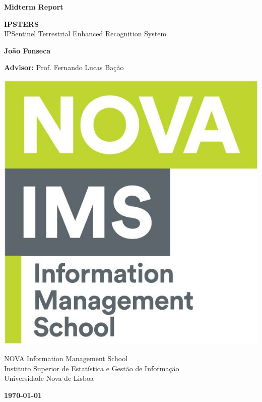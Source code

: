 \documentclass[12pt, english, openany]{book}
\begin{document}

\begin{titlepage}
	\clearpage\thispagestyle{empty}
	\centering
	\vspace{1.2cm}

	{\large \textbf{Midterm Report} \par}
	\vspace{2.5cm}
	{\Huge \textbf{IPSTERS}} \\
  \vspace{1cm}
  {\Huge IPSentinel Terrestrial Enhanced Recognition System} \\
	\vspace{2.5cm}
	{\large \textbf{João Fonseca} \par}
	\vspace{.75cm}
	{\large \textbf{Advisor:} Prof. Fernando Lucas Bação \par}

	\vspace{1.5cm}
    \includegraphics[scale=0.2]{ims_logo.png}
  \vspace{1.3cm}

	{\normalsize NOVA Information Management School \\
		Instituto Superior de Estatística e Gestão de Informação \\
		Universidade Nova de Lisboa \par}

  \vspace{1.5cm}

	{\normalsize \textbf \today \par}
	\pagebreak
\end{titlepage}
\end{document}
